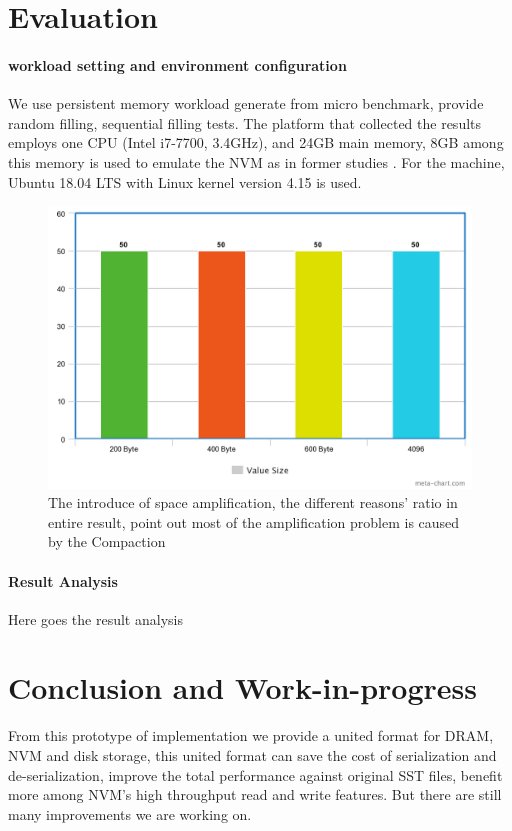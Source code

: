 \section{Evaluation}

\paragraph{workload setting and environment configuration} We use persistent memory workload generate from micro benchmark, provide random filling, sequential filling tests. The platform that collected the results employs one CPU (Intel i7-7700, 3.4GHz), and 24GB main memory, 8GB among this memory is used to emulate the NVM as in former studies\cite{kannan2018redesigning,kaiyrakhmet2019slm} . For the machine, Ubuntu 18.04 LTS with Linux kernel version 4.15 is used. 

\begin{figure}
	\centering
	\includegraphics[width=0.7\columnwidth]{fig/meta2}
	\caption{The introduce of space amplification, the different reasons' ratio in entire result, point out most of the amplification problem is caused by the Compaction}
	\label{fig:space_amplification}
\end{figure}

\paragraph{Result Analysis} Here goes the result analysis

\section{Conclusion and Work-in-progress}
From this prototype of implementation we provide a united format for DRAM, NVM and disk storage, this united format can save the cost of serialization and de-serialization, improve the total performance against original SST files, benefit more among NVM's high throughput read and write features. But there are still many improvements we are working on.

